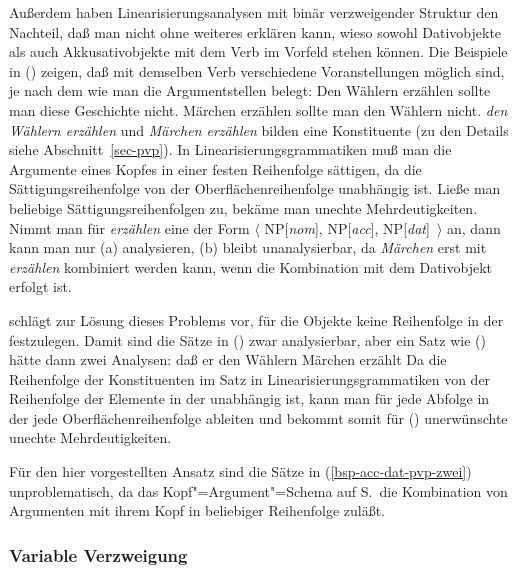 %
Außerdem haben Linearisierungsanalysen mit binär verzweigender Struktur den Nachteil,
daß man nicht ohne weiteres erklären kann,
wieso sowohl Dativobjekte als auch Akkusativobjekte mit dem Verb im Vorfeld stehen können.
Die Beispiele in () zeigen, daß mit demselben Verb verschiedene Voranstellungen möglich sind,
je nach dem wie man die Argumentstellen belegt:
\eal
\label{bsp-acc-dat-pvp-zwei}
\ex Den Wählern erzählen sollte man diese Geschichte nicht.
\ex Märchen erzählen sollte man den Wählern nicht.
\zl
\emph{den Wählern erzählen} und \emph{Märchen erzählen} bilden eine Konstituente (zu den Details
siehe Abschnitt~\ref{sec-pvp}). In Linearisierungsgrammatiken muß man die Argumente eines Kopfes
in einer festen Reihenfolge sättigen, da die Sättigungsreihenfolge von der Oberflächenreihenfolge unabhängig ist. Ließe
man beliebige Sättigungsreihenfolgen zu, bekäme man unechte Mehrdeutigkeiten.
Nimmt man für \emph{erzählen} eine \subcatl der Form $\langle$ NP[\textit{nom}], NP[\textit{acc}],
NP[\textit{dat}]~$\rangle$ an, dann kann man nur (a) analysieren, (b) bleibt unanalysierbar,
da \emph{Märchen} erst mit \emph{erzählen} kombiniert werden kann, wenn die Kombination
mit dem Dativobjekt erfolgt ist.

\citet[]{Kathol2000a} schlägt zur Lösung dieses Problems vor,
für die Objekte keine Reihenfolge in der \subcatl festzulegen. Damit sind
die Sätze in () zwar analysierbar, aber ein Satz wie () hätte
dann zwei Analysen:
\ea
daß er den Wählern Märchen erzählt
\z
Da die Reihenfolge der Konstituenten im Satz in Linearisierungsgrammatiken
von der Reihenfolge der Elemente in der \subcatl unabhängig ist, kann man
für jede Abfolge in der \subcatl jede Oberflächenreihenfolge ableiten und bekommt
somit für () unerwünschte unechte Mehrdeutigkeiten.

Für den hier vorgestellten Ansatz sind die Sätze in (\ref{bsp-acc-dat-pvp-zwei}) unproblematisch,
da das Kopf"=Argument"=Schema auf S.\,\pageref{schema-bin-prel2} die Kombination von Argumenten
mit ihrem Kopf in beliebiger Reihenfolge zuläßt.
%
%


\subsubsection{Variable Verzweigung}
\label{crysmann}

